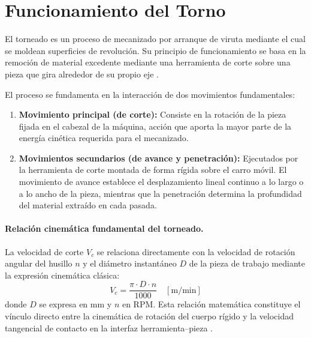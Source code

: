 \documentclass[12pt,a4paper]{article}
\begin{document}
\vspace{4pt}
\noindent{\color{utablue!30}\rule{\textwidth}{0.5pt}}
\vspace{2pt}
\section{Funcionamiento del Torno}
\label{sec:funcionamiento}

El torneado es un proceso de mecanizado por arranque de viruta mediante el cual se moldean superficies de revolución. Su principio de funcionamiento se basa en la remoción de material excedente mediante una herramienta de corte sobre una pieza que gira alrededor de su propio eje \cite{groover2020}.

El proceso se fundamenta en la interacción de dos movimientos fundamentales:
\begin{enumerate}[itemsep=3pt, topsep=2pt, parsep=0pt]
    \item \textbf{Movimiento principal (de corte):} Consiste en la rotación de la pieza fijada en el cabezal de la máquina, acción que aporta la mayor parte de la energía cinética requerida para el mecanizado.
    \item \textbf{Movimientos secundarios (de avance y penetración):} Ejecutados por la herramienta de corte montada de forma rígida sobre el carro móvil. El movimiento de avance establece el desplazamiento lineal continuo a lo largo o a lo ancho de la pieza, mientras que la penetración determina la profundidad del material extraído en cada pasada.
\end{enumerate}

\paragraph{Relación cinemática fundamental del torneado.}
La velocidad de corte $V_c$ se relaciona directamente con la velocidad de rotación angular del husillo $n$ y el diámetro instantáneo $D$ de la pieza de trabajo mediante la expresión cinemática clásica:
\begin{equation}
    V_c = \frac{\pi \cdot D \cdot n}{1000} \quad [\si{\meter\per\minute}]
    \label{eq:velocidad_corte}
\end{equation}
donde $D$ se expresa en $\si{\milli\meter}$ y $n$ en RPM. Esta relación matemática constituye el vínculo directo entre la cinemática de rotación del cuerpo rígido y la velocidad tangencial de contacto en la interfaz herramienta--pieza \cite{hibbeler2016}.
\end{document}
